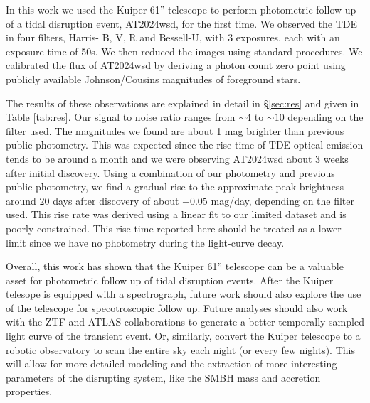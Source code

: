\documentclass{aastex631}
\begin{document}
In this work we used the Kuiper 61'' telescope to perform photometric follow up of a tidal disruption event, AT2024wsd, for the first time. We observed the TDE in four filters, Harris- B, V, R and Bessell-U, with 3 exposures, each with an exposure time of 50s. We then reduced the images using standard procedures. We calibrated the flux of AT2024wsd by deriving a photon count zero point using publicly available Johnson/Cousins magnitudes of foreground stars.

The results of these observations are explained in detail in \S\ref{sec:res} and given in Table \ref{tab:res}. Our signal to noise ratio ranges from $\sim4$ to $\sim10$ depending on the filter used. The magnitudes we found are about 1 mag brighter than previous public photometry. This was expected since the rise time of TDE optical emission tends to be around a month and we were observing AT2024wsd about 3 weeks after initial discovery. Using a combination of our photometry and previous public photometry, we find a gradual rise to the approximate peak brightness around $20$ days after discovery of about $-0.05$ mag/day, depending on the filter used. This rise rate was derived using a linear fit to our limited dataset and is poorly constrained. This rise time reported here should be treated as a lower limit since we have no photometry during the light-curve decay.

Overall, this work has shown that the Kuiper 61'' telescope can be a valuable asset for photometric follow up of tidal disruption events. After the Kuiper telesope is equipped with a spectrograph, future work should also explore the use of the telescope for specotroscopic follow up. Future analyses should also work with the ZTF and ATLAS collaborations to generate a better temporally sampled light curve of the transient event. Or, similarly, convert the Kuiper telescope to a robotic observatory to scan the entire sky each night (or every few nights). This will allow for more detailed modeling and the extraction of more interesting parameters of the disrupting system, like the SMBH mass and accretion properties. 




\end{document}
